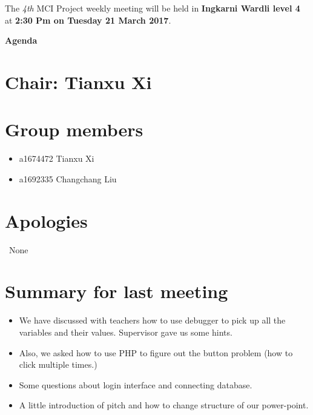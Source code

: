 \documentclass[11pt, a4paper]{article}
\begin{document}
\noindent The {\em 4th} MCI Project weekly meeting will be held in {\bf Ingkarni Wardli level 4} at {\bf 2:30 Pm on Tuesday 21 March 2017}.


\vspace*{15pt}

\begin{center}
\huge \bf Agenda
\end{center}



\section*{Chair: Tianxu Xi           }
\section{Group members}
\begin{itemize}
	\item a1674472  Tianxu Xi
	\item a1692335 Changchang Liu
\end{itemize}

\section{Apologies}
\ None \\


\section{Summary for last meeting}
\begin {itemize} 
\item We have discussed with teachers how to use debugger to pick up all the variables and their values. Supervisor gave us some hints. 
\item Also, we asked how to use PHP to figure out the button problem (how to click multiple times.)
\item Some questions about login interface and connecting database.
\item A little introduction of pitch and how to change structure of our power-point.
\end {itemize}
\end{document}
